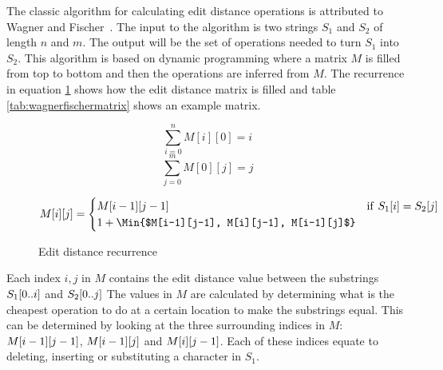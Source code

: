 The classic algorithm for calculating edit distance operations is attributed to Wagner and
Fischer~\cite{WagnerFischer}. The input to the algorithm is two strings $S_1$ and $S_2$ of
length $n$ and $m$. The output will be the set of operations needed to turn $S_1$ into
$S_2$. This algorithm is based on dynamic programming where a matrix $M$ is filled from
top to bottom and then the operations are inferred from $M$. The recurrence in equation
\ref{eq:editdistancerecurrence} shows how the edit distance matrix is filled and table
\ref{tab:wagnerfischermatrix} shows an example matrix.

\begin{figure}[t]
    \begin{center}
	$$
		\sum^{n}_{i = 0}{M[i][0] = i}
	$$
	$$
		\sum^{m}_{j = 0}{M[0][j] = j}
	$$

	\begin{gather*}
		M[i][j] =
		\begin{cases}
			M[i-1][j-1] & \mathrm{if\ } S_1[i] = S_2[j] \\
            1 + \Min{$M[i-1][j-1], M[i][j-1], M[i-1][j]$}
		\end{cases}
	\end{gather*}
	\caption{Edit distance recurrence}
	\label{eq:editdistancerecurrence}
    \end{center}
\end{figure}

Each index $i, j$ in $M$ contains the edit distance value between the substrings
$S_1[{0..i}]$ and $S_2[{0..j}]$ The values in $M$ are calculated
by determining what is the cheapest operation to do at a certain location to make the
substrings equal. This can be determined by looking at the three surrounding indices in
$M$: $M[{i - 1}][{j - 1}]$, $M[{i - 1}][{j}]$ and
$M[{i}][{j - 1}]$. Each of these indices equate to deleting, inserting or
substituting a character in $S_1$. 

